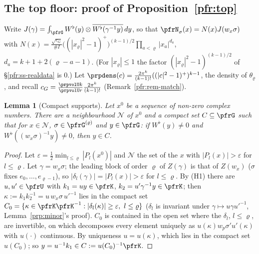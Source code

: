 \documentclass[10pt]{amsart}
\newtheorem{lemma}[theorem]{Lemma}
\theoremstyle{definition}
\theoremstyle{remark}
\begin{document}
\subsection{The top floor: proof of Proposition~\ref{pfr:top}}\label{prp:ss-top}

Write $J(\gamma)=\int_\pfrG W^\flat(y)\otimes\overline{W^\flat(\gamma^{-1}y)}\,dy$, so that
$\pfrN_\sigma(x)=N(x)J(w_x\sigma)$ with $N(x)=\frac{\sqrt{c_G}}{\#I}\bigl((|x_\varrho|^2-1)^+\bigr)^{(k-1)/2}\prod_{a<\varrho}
|x_a|^{d_a}$, $d_a=k+1+2(\varrho-a-1)$. (For $|x_\varrho|\le1$ the factor $(|x_\varrho|^2-1)^{(k-1)/2}$ of
\S\ref{pfr:ss-realdata} is $0$.) Let $\prpdens(c)=\frac{2\pi^k}{(k-1)!}((|c|^2-1)^+)^{k-1}$, the
density of $\theta_\varrho$, and recall $c_G=\frac{\prpvolU k}{\prpvolU r}\frac{2\pi^k}{(k-1)!}$
(Remark~\ref{pfr:rem-match}).

\begin{lemma}[Compact supports]\label{prp:support}
Let $x^0$ be a sequence of non-zero complex numbers. There are a neighbourhood $\mathcal N$ of $x^0$ and a
compact set $C\subseteq\pfrG$ such that for $x\in\mathcal N$, $\sigma\in\pfrG^{(\varrho)}$ and $y\in\pfrG$:
if $W^\flat(y)\ne0$ and $W^\flat((w_x\sigma)^{-1}y)\ne0$, then $y\in C$.
\end{lemma}
\begin{proof}
Let $\varepsilon=\frac12\min_{l\le\varrho}|P_l(x^0)|$ and $\mathcal N$ the set of the $x$ with $|P_l(x)|>\varepsilon$ for
$l\le\varrho$. Let $\gamma=w_x\sigma$; the leading block of order $\varrho$ of $Z(\gamma)$ is that of $Z(w_x)$ ($\sigma$ fixes
$e_0,\dots,e_{\varrho-1}$), so $|\delta_l(\gamma)|=|P_l(x)|>\varepsilon$ for $l\le\varrho$. By (H1) there are $u,u'\in\pfrU$
with $k_1=uy\in\pfrK$, $k_2=u'\gamma^{-1}y\in\pfrK$; then $\kappa:=k_1k_2^{-1}=u\,w_x\sigma\,u'^{-1}$ lies in the compact
set $C_0=\{\kappa\in\pfrK\pfrK^{-1}:|\delta_l(\kappa)|\ge\varepsilon,\ l\le\varrho\}$ ($\delta_l$ is invariant under
$\gamma\mapsto u\gamma u'^{-1}$, Lemma~\ref{prp:minor}'s proof). $C_0$ is contained in the open set where the $\delta_l$,
$l\le\varrho$, are invertible, on which {\cite[Proposition~3.41]{P51}} decomposes every element uniquely as
$u(\kappa)w_{p}\sigma'u'(\kappa)$ with $u(\cdot)$ continuous. By uniqueness $u=u(\kappa)$, which lies in the compact
set $u(C_0)$; so $y=u^{-1}k_1\in C:=u(C_0)^{-1}\pfrK$.
\end{proof}
\end{document}
